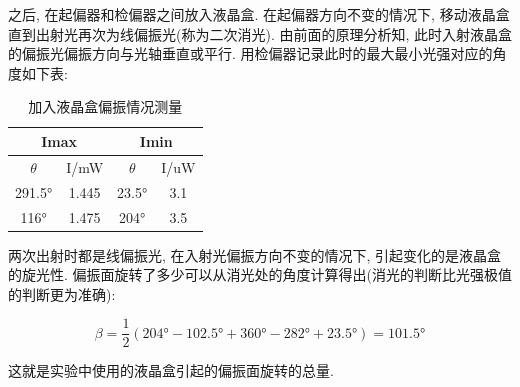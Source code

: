 \documentclass[12pt,a4paper]{article}
\newcommand{\be}[1]{
    \begin{equation}
        #1
    \end{equation}
}
\begin{document}
之后, 在起偏器和检偏器之间放入液晶盒. 在起偏器方向不变的情况下, 移动液晶盒直到出射光再次为线偏振光(称为二次消光). 由前面的原理分析知, 此时入射液晶盒的偏振光偏振方向与光轴垂直或平行. 
用检偏器记录此时的最大最小光强对应的角度如下表: 
\begin{table}[H]
    \centering
    \begin{tabular}{|cc|cc|}
    \hline
    \multicolumn{2}{|c|}{Imax}          & \multicolumn{2}{c|}{Imin}         \\ \hline
    \multicolumn{1}{|c|}{$\theta$} & I/mW   & \multicolumn{1}{c|}{$\theta$}  & I/uW \\ \hline
    \multicolumn{1}{|c|}{291.5°}  & 1.445 & \multicolumn{1}{c|}{23.5°}   & 3.1 \\ \hline
    \multicolumn{1}{|c|}{116°} & 1.475 & \multicolumn{1}{c|}{204°} & 3.5 \\ \hline
    \end{tabular}
    \caption{加入液晶盒偏振情况测量}
    \end{table}

两次出射时都是线偏振光, 在入射光偏振方向不变的情况下, 引起变化的是液晶盒的旋光性. 偏振面旋转了多少可以从消光处的角度计算得出(消光的判断比光强极值的判断更为准确): 
\be{\beta=\frac{1}{2}(204°-102.5°+360°-282°+23.5°)=101.5°}
这就是实验中使用的液晶盒引起的偏振面旋转的总量. 
\end{document}
